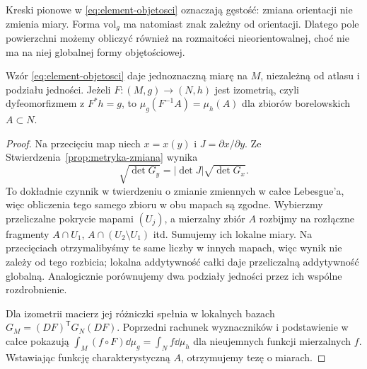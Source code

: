 Kreski pionowe w \eqref{eq:element-objetosci}
oznaczają gęstość: zmiana orientacji nie zmienia
miary. Forma $\mathrm{vol}_g$ ma natomiast znak
zależny od orientacji. Dlatego pole powierzchni
możemy obliczyć również na rozmaitości
nieorientowalnej, choć nie ma na niej globalnej
formy objętościowej.

\begin{twierdzenie}
\label{thm:element-objetosci-globalny}
Wzór \eqref{eq:element-objetosci} daje
jednoznaczną miarę na $M$, niezależną od atlasu
i podziału jedności. Jeżeli $F:(M,g)\to(N,h)$
jest izometrią, czyli dyfeomorfizmem z $F^*h=g$,
to $\mu_g(F^{-1}A)=\mu_h(A)$ dla zbiorów
borelowskich $A\subset N$.
\end{twierdzenie}
\begin{proof}
Na przecięciu map niech $x=x(y)$ i
$J=\partial x/\partial y$. Ze
Stwierdzenia~\ref{prop:metryka-zmiana} wynika
\[
 \sqrt{\det G_y}
   =|\det J|\sqrt{\det G_x}.
\]
To dokładnie czynnik w twierdzeniu o zmianie
zmiennych w całce Lebesgue'a, więc obliczenia
tego samego zbioru w obu mapach są zgodne.
Wybierzmy przeliczalne pokrycie mapami
$(U_j)$, a mierzalny zbiór $A$ rozbijmy
na rozłączne fragmenty
$A\cap U_1$,
$A\cap(U_2\setminus U_1)$ itd.
Sumujemy ich lokalne miary. Na przecięciach
otrzymalibyśmy te same liczby w innych mapach,
więc wynik nie zależy od tego rozbicia;
lokalna addytywność całki daje przeliczalną
addytywność globalną. Analogicznie porównujemy
dwa podziały jedności przez ich wspólne
rozdrobnienie.

Dla izometrii macierz jej różniczki spełnia
w lokalnych bazach $G_M=(DF)^{\mathsf T}G_N(DF)$.
Poprzedni rachunek wyznaczników i podstawienie
w całce pokazują
$\int_M(f\circ F)\dd\mu_g=\int_N f\dd\mu_h$
dla nieujemnych funkcji mierzalnych $f$.
Wstawiając funkcję charakterystyczną $A$,
otrzymujemy tezę o miarach.
\end{proof}

